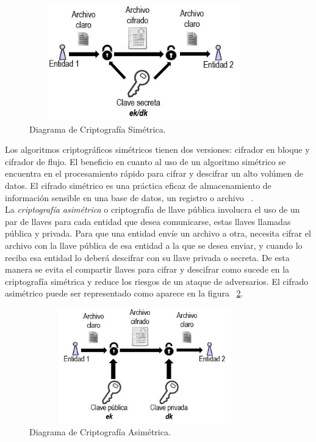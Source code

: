 \begin{figure}[H]
\centering
	\includegraphics[width=10cm, height=5cm]{./images/Cripto_Simetrica.jpg}
	\caption{Diagrama de Criptografía Simétrica.}
	\label{fig:2-3-1}
\end{figure}

Los algoritmos criptográficos simétricos tienen dos versiones: cifrador en bloque y cifrador de flujo. El beneficio en cuanto al uso de un algoritmo simétrico se encuentra en el procesamiento rápido para cifrar y descifrar un alto volúmen de datos. El cifrado simétrico es una práctica eficaz de almacenamiento de información sensible en una base de datos, un registro o archivo  ~\cite{sime}. \\

La \textit{ criptografía asimétrica} o criptografía de llave pública involucra el uso de un par de llaves para cada entidad que desea comunicarse, estas llaves llamadas pública y privada. Para que una entidad envíe un archivo a otra, necesita cifrar el archivo con la llave pública de esa entidad a la que se desea enviar, y cuando lo reciba esa entidad lo deberá descifrar con su llave privada o secreta. De esta manera se evita el compartir llaves para cifrar y descifrar como sucede en la criptografía simétrica y reduce los riesgos de un ataque de adversarios. El cifrado asimétrico puede ser representado como aparece en la figura ~\ref{fig:2-4-1}. \\

\begin{figure}[H]
\centering
	\includegraphics[width=10cm, height=5cm]{./images/Cripto_Asimetrica.jpg}
	\caption{Diagrama de Criptografía Asimétrica.}
	\label{fig:2-4-1}
\end{figure}

